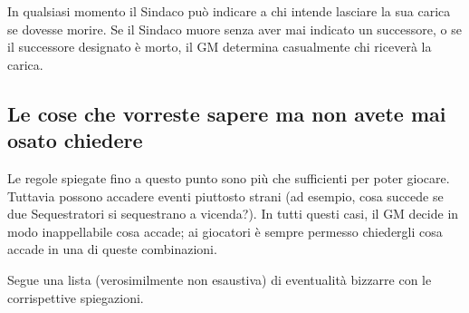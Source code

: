 \documentclass[a4paper,10pt]{article}
\begin{document}
In qualsiasi momento il Sindaco può indicare a chi intende lasciare la sua carica se dovesse morire. Se il Sindaco muore senza aver mai indicato un successore, o se il successore designato è morto, il GM determina casualmente chi riceverà la carica.


\subsection{Le cose che vorreste sapere ma non avete mai osato chiedere}

Le regole spiegate fino a questo punto sono più che sufficienti per poter giocare. Tuttavia possono accadere eventi piuttosto strani (ad esempio, cosa succede se due Sequestratori si sequestrano a vicenda?). In tutti questi casi, il GM decide in modo inappellabile cosa accade; ai giocatori è sempre permesso chiedergli cosa accade in una di queste combinazioni.

Segue una lista (verosimilmente non esaustiva) di eventualità bizzarre con le corrispettive spiegazioni.
\end{document}
